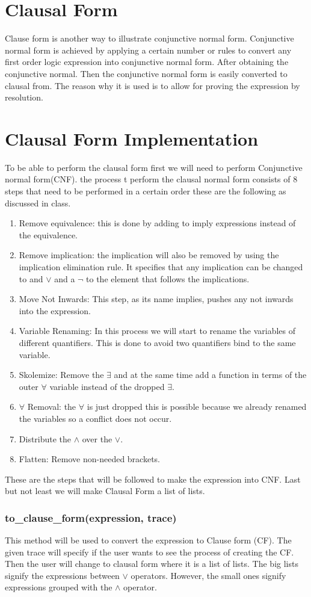 {\section{Clausal Form}
Clause form is another way to illustrate conjunctive normal form. Conjunctive normal form is achieved by applying a certain number or rules to convert any first order logic expression into conjunctive normal form. After obtaining the conjunctive normal. Then the conjunctive normal form is easily converted to clausal from. The reason why it is used is to allow for proving the expression by resolution.
\section{Clausal Form Implementation}
To be able to perform the clausal form first we will need to perform Conjunctive normal form(CNF). the process t perform the clausal normal form consists of 8 steps that need to be performed in a certain order these are the following as discussed in class.
\begin{enumerate}
\item{Remove equivalence: this is done by adding to imply expressions instead of the equivalence.}
\item{Remove implication: the implication will also be removed by using the implication elimination rule. It specifies that any implication can be changed to and $\vee$ and a $\neg$ to the element that follows the implications.}
\item{Move Not Inwards: This step, as its name implies, pushes any not inwards into the expression.}
\item{Variable Renaming: In this process we will start to rename the variables of different quantifiers. This is done to avoid two quantifiers bind to the same variable.}
\item{Skolemize: Remove the $\exists$ and at the same time add a function in terms of the outer $\forall$ variable instead of the dropped $\exists$.}
\item{$\forall$ Removal: the $\forall$ is just dropped this is possible because we already renamed the variables so a conflict does not occur.}
\item{Distribute the $\wedge$ over the $\vee$.}
\item{Flatten: Remove non-needed brackets.}
\end{enumerate}
These are the steps that will be followed to make the expression into CNF. Last but not least we will make Clausal Form a list of lists.
\subsubsection{to\_clause\_form(expression, trace)}
This method will be used to convert the expression to Clause form (CF). The given trace will specify if the user wants to see the process of creating the CF. Then the user will change to clausal form where it is a list of lists. The big lists signify the expressions between $\vee$ operators. However, the small ones signify expressions grouped with the $\wedge$ operator.
}
